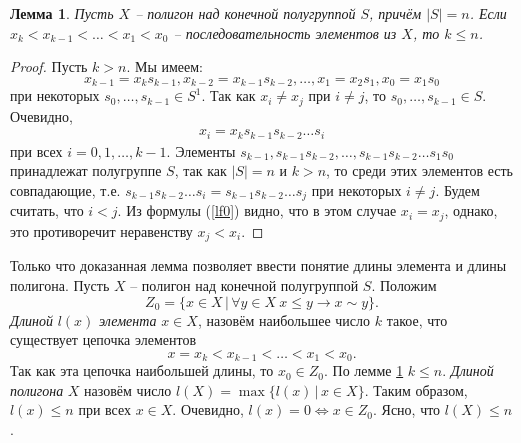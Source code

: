 \documentclass[a4paper]{article}
\newtheorem{lemma}{Лемма}
\begin{document}
	\begin{lemma} \label{l04}
		Пусть $X$ -- полигон над конечной полугруппой $S$, причём $|S| = n$. Если $x_k < x_{k-1} < \ldots < x_1 < x_0$ -- последовательность элементов из $X$, то $k \leqslant n$.
	\end{lemma}
	\begin{proof}
		Пусть $k > n$. Мы имеем: $$x_{k-1} = x_k s_{k-1}, x_{k-2} = x_{k-1}s_{k-2}, \ldots , x_1 = x_2 s_1, x_0 = x_1 s_0$$ при некоторых $s_0,\ldots,s_{k-1} \in S^1$. Так как $x_i \neq x_j$ при $i \neq j$, то $s_0,\ldots,s_{k-1} \in S$. Очевидно,
		\begin{gather}
			x_i = x_k s_{k-1} s_{k-2} \ldots s_i \label{lf0}
		\end{gather}
		при всех $i = 0,1,\ldots,k-1$. Элементы $s_{k-1},s_{k-1}s_{k-2},\ldots,s_{k-1}s_{k-2}\ldots s_1s_0$ принадлежат полугруппе $S$, так как $|S| = n$ и $k>n$, то среди этих элементов есть совпадающие, т.е. $s_{k-1}s_{k-2}\ldots s_i = s_{k-1}s_{k-2}\ldots s_j$ при некоторых $i\neq j$. Будем считать, что $i < j$. Из формулы (\ref{lf0}) видно, что в этом случае $x_i = x_j$, однако, это противоречит неравенству $x_j < x_i$.
	\end{proof}
	
	Только что доказанная лемма позволяет ввести понятие длины элемента и длины полигона. Пусть $X$ -- полигон над конечной полугруппой $S$. Положим $$ Z_0 = \{ x \in X \, | \, \forall y \in X \ x \leqslant y \rightarrow x \sim y \}.$$  \textit{Длиной} $l(x)$ \textit{элемента} $x \in X$, назовём наибольшее число $k$ такое, что существует цепочка элементов $$x=x_k < x_{k-1} < \ldots < x_1 < x_0.$$ Так как эта цепочка наибольшей длины, то $x_0 \in Z_0$. По лемме \ref{l04} $k \leqslant n$. \textit{Длиной полигона} $X$ назовём число $l(X) = \max \{ l(x)\, | \, x \in X\}$. Таким образом, $l(x) \leqslant n$ при всех $x \in X$. Очевидно, $l(x) = 0 \Leftrightarrow x \in Z_0$. Ясно, что $l(X) \leqslant n$.
	
\end{document}
